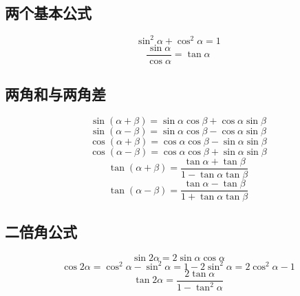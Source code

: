 
\begin{issues}
\issueDraft
{}
\end{issues}

\subsection{两个基本公式}
\begin{equation}
\sin^2\alpha + \cos^2\alpha = 1
\end{equation}
\begin{equation}
\frac{\sin\alpha}{\cos\alpha} = \tan\alpha
\end{equation}

\subsection{两角和与两角差}
\begin{equation}\label{eq_HsAnTf_5}
\sin(\alpha + \beta) = \sin\alpha \cos\beta + \cos\alpha \sin\beta
\end{equation}
\begin{equation}\label{eq_HsAnTf_6}
\sin(\alpha - \beta) = \sin\alpha \cos\beta - \cos\alpha \sin\beta
\end{equation}
\begin{equation}\label{eq_HsAnTf_4}
\cos(\alpha + \beta) = \cos\alpha \cos\beta - \sin\alpha \sin\beta
\end{equation}
\begin{equation}\label{eq_HsAnTf_3}
\cos(\alpha - \beta) = \cos\alpha \cos\beta + \sin\alpha \sin\beta
\end{equation}
\begin{equation}\label{eq_HsAnTf_7}
\tan(\alpha + \beta) = \frac{\tan\alpha+\tan\beta}{1-\tan\alpha \tan\beta}
\end{equation}
\begin{equation}\label{eq_HsAnTf_8}
\tan(\alpha - \beta) = \frac{\tan\alpha - \tan\beta}{1+\tan\alpha \tan\beta}
\end{equation}

\subsection{二倍角公式}
\begin{equation}
\sin2\alpha = 2\sin\alpha \cos\alpha 
\end{equation}
\begin{equation}
\cos2\alpha = \cos^2\alpha - \sin^2\alpha = 1 - 2\sin^2\alpha = 2\cos^2\alpha -1
\end{equation}
\begin{equation}
\tan2\alpha = \frac{2\tan\alpha}{1-\tan^2\alpha}
\end{equation}

